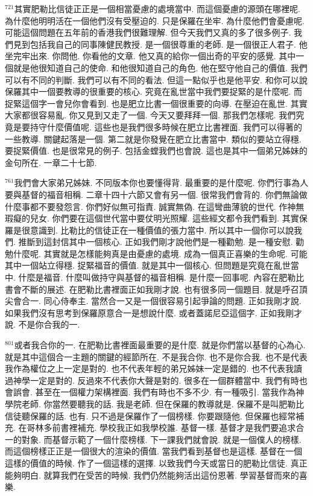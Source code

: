 \documentclass{book}
\begin{document}
$^{721}$其實肥勒比信徒正正是一個相當憂慮的處境當中.
而這個憂慮的源頭在哪裡呢.
為什麼他明明活在一個他們沒有受壓迫的.
只是保羅在坐牢.
為什麼他們會憂慮呢.
可能這個問題在五年前的香港我們很難理解.
但今天我們又真的多了很多例子.
我們見到包括我自己的同事陳健民教授.
是一個很尊重的老師.
是一個很正人君子.
他坐完牢出來.
你問他.
你看他的文章.
他又真的給你一個出奇的平安的感覺.
其中一個就是他很知道自己的使命.
和他很知道自己的角色.
他在堅守他自己的價值.
我們可以有不同的判斷.
我們可以有不同的看法.
但這一點似乎也是他平安.
和你可以說保羅其中一個要教導的很重要的核心.
究竟在亂世當中我們要捉緊的是什麼呢.
而捉緊這個字一會兒你會看到.
也是肥立比書一個很重要的向導.
在壓迫在亂世.
其實大家都很容易亂.
你又見到又走了一個.
今天又要拜拜一個.
那我們怎樣呢.
我們究竟是要持守什麼價值呢.
這些也是我們很多時候在肥立比書裡面.
我們可以得著的一些教導.
關鍵起落是一個.
第二就是你發覺在肥立比書當中.
類似的要站立得穩.
要捉緊價值.
也是很常見的例子.
包括金螳我們也會說.
這也是其中一個弟兄姊妹的金句所在.
一章二十七節.

$^{761}$我們會大家弟兄姊妹.
不同版本你也要懂得背.
最重要的是什麼呢.
你們行事為人要與基督的福音相稱.
二章十四十六節又會有另一個.
很常我們會背的.
你們無論做什麼事都不要發怨言.
你們好似無可指責.
誠實無偽.
在這彎曲薄貌的世代.
作神無瑕癡的兒女.
你們要在這個世代當中要仗明光照耀.
這些經文都令我們看到.
其實保羅是很意識到.
比勒比的信徒正在一種價值的張力當中.
所以其中一個你可以說我們.
推斷到這封信其中一個核心.
正如我們剛才說他們是一種勸勉.
是一種安慰.
勸勉什麼呢.
其實就是怎樣能夠真是由憂慮的處境.
成為一個真正喜樂的生命呢.
可能其中一個站立得穩.
捉緊福音的價值.
就是其中一個核心.
但問題是究竟在亂世當中.
什麼是福音.
什麼叫做持守與基督的福音相稱.
是什麼一回事呢.
內容在肥勒比書會不斷的展述.
在肥勒比書裡面正如我剛才說.
也有很多同一個題目.
就是呼召頂尖會合一.
同心侍奉主.
當然合一又是一個很容易引起爭論的問題.
正如我剛才說.
如果我們沒有思考到保羅原意合一是想說什麼.
或者蓋諾尼亞這個字.
正如我剛才說.
不是你合我的一.

$^{801}$或者我合你的一.
在肥勒比書裡面最重要的是什麼.
就是你們當以基督的心為心.
就是其中這個合一主題的關鍵的經節所在.
不是我合你.
也不是你合我.
也不是代表我作為權位之上一定是對的.
也不代表年輕的弟兄姊妹一定是錯的.
也不代表我讀過神學一定是對的.
反過來不代表你大聲是對的.
很多在一個群體當中.
我們有時也會誤會.
甚至在一個權力架構裡面.
我們有時也不多不少.
有一種吸引.
當我作為神學院老師.
你當然要聽我的話.
我是老師.
但在保羅的教導就是.
保羅不是叫肥勒比信徒聽保羅的話.
也有.
只不過是保羅作了一個榜樣.
你要跟隨他.
但保羅也經常補充.
在哥林多前書裡補充.
學校我正如我學校誰.
基督一樣.
基督才是我們要追求合一的對象.
而基督示範了一個什麼榜樣.
下一課我們就會說.
就是一個僕人的榜樣.
而這個榜樣正正是一個很大的渲染的價值.
當我們看到基督也是這樣.
基督在一個這樣的價值的時候.
作了一個這樣的選擇.
以致我們今天或當日的肥勒比信徒.
真正能夠明白.
就算我們在受苦的時候.
我們仍然能夠活出這份恩著.
學習基督而來的喜樂.
\end{document}
